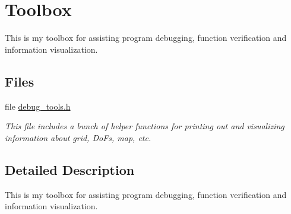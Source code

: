 \hypertarget{group__toolbox}{}\section{Toolbox}
\label{group__toolbox}


This is my toolbox for assisting program debugging, function verification and information visualization.  


\subsection*{Files}
\begin{DoxyCompactItemize}
\item 
file \hyperlink{debug__tools_8h}{debug\+\_\+tools.\+h}
\begin{DoxyCompactList}\small\item\em This file includes a bunch of helper functions for printing out and visualizing information about grid, Do\+Fs, map, etc. \end{DoxyCompactList}\end{DoxyCompactItemize}


\subsection{Detailed Description}
This is my toolbox for assisting program debugging, function verification and information visualization. 


